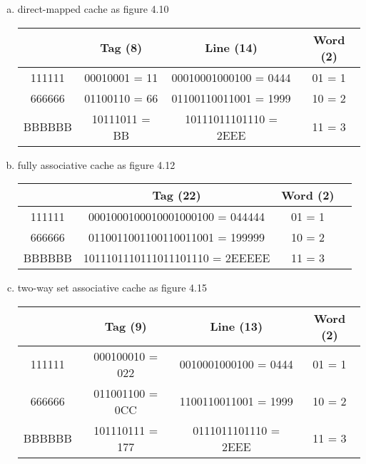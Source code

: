 \documentclass[11pt]{article}  %
\begin{document}
\begin{enumerate}[a.]
    \item direct-mapped cache as figure 4.10
        \begin{table}[H]
            \centering
            \begin{tabular}{|c|c|c|c|}
                \hline
                    & Tag (8)       & Line (14)             & Word (2) \\ \hline
                111111 & 00010001 = 11 & 00010001000100 = 0444 & 01 = 1   \\ \hline
                666666 & 01100110 = 66 & 01100110011001 = 1999 & 10 = 2   \\ \hline
                BBBBBB & 10111011 = BB & 10111011101110 = 2EEE & 11 = 3   \\ \hline
            \end{tabular}
        \end{table}
    \item fully associative cache as figure 4.12
    \begin{table}[H]
        \centering
        \begin{tabular}{|c|c|c|c|}
            \hline
                & Tag (22)                     & Word (2) \\ \hline
            111111 & 0001000100010001000100 = 044444 & 01 = 1   \\ \hline
            666666 & 0110011001100110011001 = 199999 & 10 = 2   \\ \hline
            BBBBBB & 1011101110111011101110 = 2EEEEE & 11 = 3   \\ \hline
        \end{tabular}
    \end{table}
    \item two-way set associative cache as figure 4.15
    \begin{table}[H]
        \centering
        \begin{tabular}{|c|c|c|c|}
            \hline
                & Tag (9)         & Line (13)            & Word (2) \\ \hline
            111111 & 000100010 = 022 & 0010001000100 = 0444 & 01 = 1   \\ \hline
            666666 & 011001100 = 0CC & 1100110011001 = 1999 & 10 = 2   \\ \hline
            BBBBBB & 101110111 = 177 & 0111011101110 = 2EEE & 11 = 3   \\ \hline
        \end{tabular}
    \end{table}
\end{enumerate}
\end{document}
